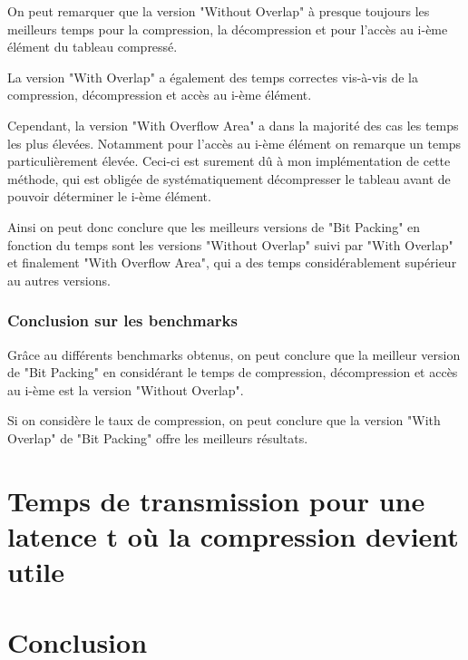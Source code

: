 \documentclass[titlepage]{article}
\begin{document}
On peut remarquer que la version "Without Overlap" à presque toujours les meilleurs temps pour la compression, la décompression et pour l'accès au i-ème élément du tableau compressé.
\par La version "With Overlap" a également des temps correctes vis-à-vis de la compression, décompression et accès au i-ème élément.
\par Cependant, la version "With Overflow Area" a dans la majorité des cas les temps les plus élevées. Notamment pour l'accès au i-ème élément on remarque un temps particulièrement élevée. Ceci-ci est surement dû à mon implémentation de cette méthode, qui est obligée de systématiquement décompresser le tableau avant de pouvoir déterminer le i-ème élément. 
\par Ainsi on peut donc conclure que les meilleurs versions de "Bit Packing" en fonction du temps sont les versions "Without Overlap" suivi par "With Overlap" et finalement "With Overflow Area", qui a des temps considérablement supérieur au autres versions. 

\subsubsection{Conclusion sur les benchmarks}

Grâce au différents benchmarks obtenus, on peut conclure que la meilleur version de "Bit Packing" en considérant le temps de compression, décompression et accès au i-ème est la version "Without Overlap".
\par Si on considère le taux de compression, on peut conclure que la version "With Overlap" de "Bit Packing" offre les meilleurs résultats. 

\clearpage



\section{Temps de transmission pour une latence t où la compression devient utile}



\clearpage




\section{Conclusion}


\clearpage
\end{document}
